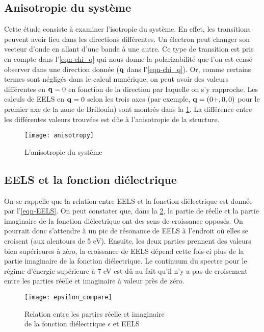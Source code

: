 \subsection{Anisotropie du système}
Cette étude consiste à examiner l'isotropie du système.
En effet, les transitions peuvent avoir lieu dans les directions différentes.
Un électron peut changer son vecteur d'onde en allant d'une bande à une autre.
Ce type de transition est pris en compte dans l'\cref{eqn-chi_q} qui nous donne la polarizabilité
que l'on est censé observer dans une direction donnée ($\vb{q}$ dans l'\cref{eqn-chi_q}).
Or, comme certains termes sont négligés dans le calcul numérique,
on peut avoir des valeurs différentes en $\vb{q} = 0$ en fonction de la direction par laquelle on s'y rapproche.
Les calculs de EELS en $\vb{q} = 0$ selon les trois axes
(par exemple, $\vb{q}=(0+,0,0)$ pour le premier axe de la zone de Brillouin)
sont montrés dans la \cref{fig-anisotropie}.
La différence entre les différentes valeurs trouvées est dûe à l'anisotropie de la structure.

\begin{figure}[!h]
    \centering
    \texttt{[image: anisotropy]}
    \caption{L'anisotropie du système}\label{fig-anisotropie}
\end{figure}

\subsection{EELS et la fonction diélectrique}
On se rappelle que la relation entre EELS et la fonction diélectrique est donnée par l'\cref{eqn-EELS}.
On peut constater que, dans la \cref{fig-epsilon_compare}, la partie de réelle et
la partie imaginaire de la fonction diélectrique ont des sens de croissance opposés.
On pourrait donc s'attendre à un pic de résonance de EELS à l'endroit où elles se croisent
(aux alentours de 5 eV).
Ensuite, les deux parties prennent des valeurs bien supérieures à zéro,
la croissance de EELS dépend cette fois-ci plus de la partie imaginaire de la fonction diélectrique.
Le continuum du spectre pour le régime d'énergie supérieure à 7 eV est dû au fait
qu'il n'y a pas de croisement entre les parties réelle et imaginaire à valeur près de zéro.

\begin{figure}[!h]
    \centering
    \texttt{[image: epsilon\_compare]}
    \caption{Relation entre les parties réelle et imaginaire\\ de la fonction diélectrique $\epsilon$ et EELS}\label{fig-epsilon_compare}
\end{figure}
\clearpage

